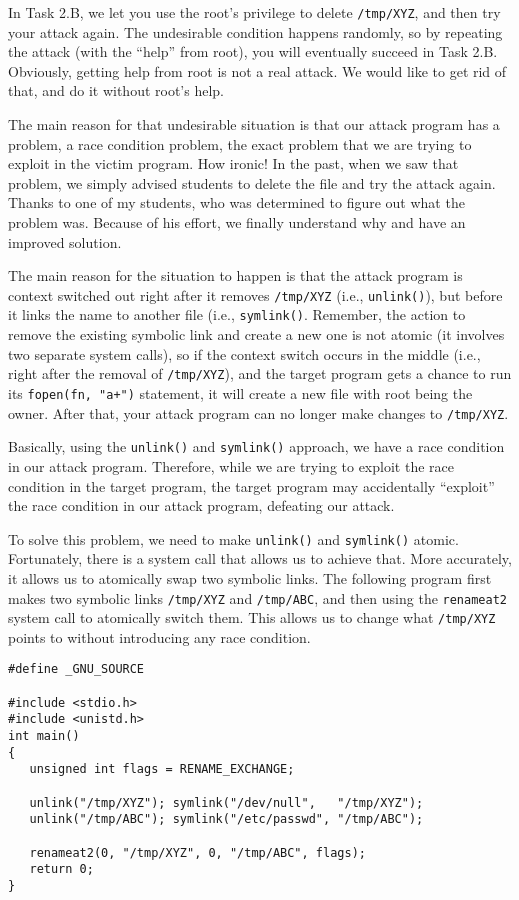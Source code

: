 In Task 2.B, we let you use the root's privilege to delete \texttt{/tmp/XYZ}, 
and then try your attack again. The undesirable condition happens randomly,
so by repeating the attack (with the ``help'' from root), you will eventually
succeed in Task 2.B. Obviously, getting help from root is not a real attack. 
We would like to get rid of that, and do it without root's help.


The main reason for that undesirable situation is that 
our attack program has a problem, a race condition problem, the exact problem that
we are trying to exploit in the victim program. How ironic!  
In the past, when we saw that problem, we simply advised students to 
delete the file and try the attack again. Thanks to one of my students, 
who was determined to figure out what the problem was. Because of his effort,
we finally understand why and have an improved solution. 


The main reason for the situation to happen is that the attack program is 
context switched out right after it removes {\tt /tmp/XYZ} (i.e., \texttt{unlink()}),
but before it links the name to another file (i.e., \texttt{symlink()}. 
Remember, the action to remove the existing 
symbolic link and create a new one is not atomic (it involves two 
separate system calls), so if the context switch occurs in the middle
(i.e., right after the removal of {\tt /tmp/XYZ}),
and the target \setuid program gets a chance to run its 
{\tt fopen(fn, "a+")} statement, it will create a new file with root being the owner.
After that, your attack program can no longer make changes to {\tt /tmp/XYZ}.


Basically, using the \texttt{unlink()} and \texttt{symlink()} approach, 
we have a race condition in our attack program. Therefore, while we 
are trying to exploit the race condition in the target program,
the target program may accidentally ``exploit'' the race condition
in our attack program, defeating our attack.  


To solve this problem, we need to make 
\texttt{unlink()} and \texttt{symlink()} atomic. Fortunately, there 
is a system call that allows us to achieve that. More accurately,
it allows us to atomically swap two symbolic links. 
The following program first makes two symbolic links \texttt{/tmp/XYZ}
and \texttt{/tmp/ABC}, and then using the
\texttt{renameat2} system call to atomically switch them. 
This allows us to change what \texttt{/tmp/XYZ} points to
without introducing any race condition. 

\begin{lstlisting}
#define _GNU_SOURCE
  
#include <stdio.h>
#include <unistd.h>
int main()
{
   unsigned int flags = RENAME_EXCHANGE;

   unlink("/tmp/XYZ"); symlink("/dev/null",   "/tmp/XYZ");
   unlink("/tmp/ABC"); symlink("/etc/passwd", "/tmp/ABC");

   renameat2(0, "/tmp/XYZ", 0, "/tmp/ABC", flags);
   return 0;
}
\end{lstlisting}


